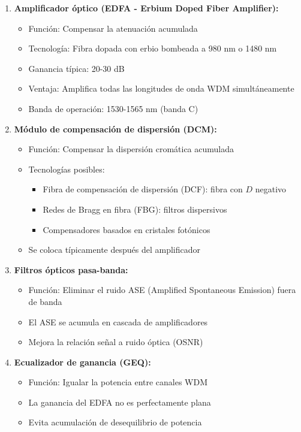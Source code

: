 \documentclass[11pt,a4paper]{article}
\begin{document}
\begin{enumerate}
    \item \textbf{Amplificador óptico (EDFA - Erbium Doped Fiber Amplifier):}
    \begin{itemize}
        \item Función: Compensar la atenuación acumulada
        \item Tecnología: Fibra dopada con erbio bombeada a 980 nm o 1480 nm
        \item Ganancia típica: 20-30 dB
        \item Ventaja: Amplifica todas las longitudes de onda WDM simultáneamente
        \item Banda de operación: 1530-1565 nm (banda C)
    \end{itemize}
    
    \item \textbf{Módulo de compensación de dispersión (DCM):}
    \begin{itemize}
        \item Función: Compensar la dispersión cromática acumulada
        \item Tecnologías posibles:
        \begin{itemize}
            \item Fibra de compensación de dispersión (DCF): fibra con $D$ negativo
            \item Redes de Bragg en fibra (FBG): filtros dispersivos
            \item Compensadores basados en cristales fotónicos
        \end{itemize}
        \item Se coloca típicamente después del amplificador
    \end{itemize}
    
    \item \textbf{Filtros ópticos pasa-banda:}
    \begin{itemize}
        \item Función: Eliminar el ruido ASE (Amplified Spontaneous Emission) fuera de banda
        \item El ASE se acumula en cascada de amplificadores
        \item Mejora la relación señal a ruido óptica (OSNR)
    \end{itemize}
    
    \item \textbf{Ecualizador de ganancia (GEQ):}
    \begin{itemize}
        \item Función: Igualar la potencia entre canales WDM
        \item La ganancia del EDFA no es perfectamente plana
        \item Evita acumulación de desequilibrio de potencia
    \end{itemize}
    

\end{enumerate}
\end{document}

